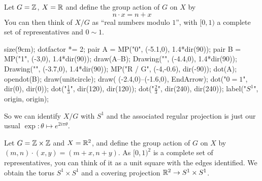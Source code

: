 \begin{example}[$\RR \to S^1$ is regular]
	Let $G = \mathbb Z$, $X = \mathbb R$
	and define the group action of $G$ on $X$ by
	\[ n \cdot x = n + x \]
	You can then think of $X/G$ as ``real numbers modulo $1$'',
	with $[0,1)$ a complete set of representatives and $0 \sim 1$. %
	\begin{center}
		\begin{asy}
			size(9cm);
			dotfactor *= 2;
			pair A = MP("0", (-5.1,0), 1.4*dir(90));
			pair B = MP("1", (-3,0), 1.4*dir(90));
			draw(A--B);
			Drawing("", (-4.4,0), 1.4*dir(90));
			Drawing("", (-3.7,0), 1.4*dir(90));
			MP("\mathbb R / G", (-4,-0.6), dir(-90));
			dot(A); opendot(B);
			draw(unitcircle);
			draw( (-2.4,0)--(-1.6,0), EndArrow);
			dot("$0=1$", dir(0), dir(0));
			dot("$\frac13$", dir(120), dir(120));
			dot("$\frac23$", dir(240), dir(240));
			label("$S^1$", origin, origin);
		\end{asy}
	\end{center}
	So we can identify $X/G$ with $S^1$
	and the associated regular projection
	is just our usual $\exp \colon \theta \mapsto e^{2i\pi \theta}$.
\end{example}

\begin{example}
	Let $G = \mathbb Z \times \mathbb Z$ and $X = \mathbb R^2$,
	and define the group action of $G$ on $X$ by $(m,n) \cdot (x,y)
	= (m+x, n+y)$.
	As $[0,1)^2$ is a complete set of representatives, %
	you can think of it as a unit square with the edges identified.
	We obtain the torus $S^1 \times S^1$
	and a covering projection $\mathbb R^2 \to S^1 \times S^1$.
\end{example}

